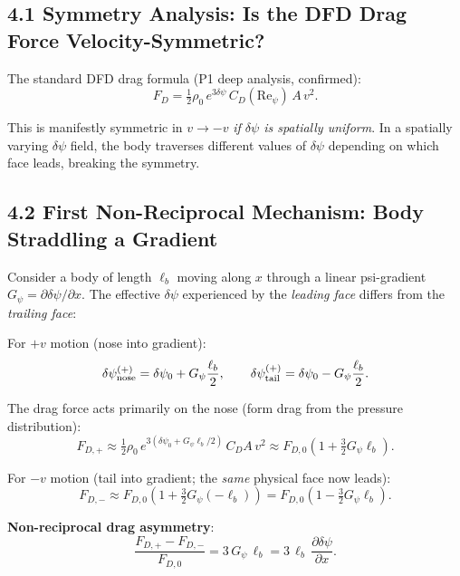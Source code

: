 \documentclass[11pt,twocolumn]{article}
\newcommand{\dpsi}{\delta\psi}
\newcommand{\Rey}{\mathrm{Re}}
\newcommand{\half}{\tfrac{1}{2}}
\begin{document}
\subsection*{4.1 Symmetry Analysis: Is the DFD Drag Force Velocity-Symmetric?}

The standard DFD drag formula (P1 deep analysis, confirmed):
\begin{equation}
F_D = \half\rho_0\,e^{3\dpsi}\,C_D(\Rey_\psi)\,A\,v^2.
\label{eq:drag_standard}
\end{equation}

This is manifestly symmetric in $v \to -v$ \emph{if $\dpsi$ is spatially
uniform}. In a spatially varying $\dpsi$ field, the body traverses
different values of $\dpsi$ depending on which face leads, breaking the
symmetry.

\subsection*{4.2 First Non-Reciprocal Mechanism: Body Straddling a
Gradient}

Consider a body of length $\ell_b$ moving along $x$ through a linear
psi-gradient $G_\psi = \partial\dpsi/\partial x$. The effective
$\dpsi$ experienced by the \emph{leading face} differs from the
\emph{trailing face}:

For $+v$ motion (nose into gradient):
\begin{equation}
\dpsi_{\rm nose}^{(+)} = \dpsi_0 + G_\psi\frac{\ell_b}{2},
\qquad
\dpsi_{\rm tail}^{(+)} = \dpsi_0 - G_\psi\frac{\ell_b}{2}.
\end{equation}

The drag force acts primarily on the nose (form drag from the pressure
distribution):
\begin{equation}
F_{D,+} \approx \half\rho_0\,e^{3(\dpsi_0 + G_\psi\ell_b/2)}\,C_D A\,v^2
\approx F_{D,0}\!\left(1 + \tfrac{3}{2}G_\psi\ell_b\right).
\label{eq:drag_plus}
\end{equation}

For $-v$ motion (tail into gradient; the \emph{same} physical face now leads):
\begin{equation}
F_{D,-} \approx F_{D,0}\!\left(1 + \tfrac{3}{2}G_\psi(-\ell_b)\right)
= F_{D,0}\!\left(1 - \tfrac{3}{2}G_\psi\ell_b\right).
\label{eq:drag_minus}
\end{equation}

\textbf{Non-reciprocal drag asymmetry}:
\begin{equation}
\frac{F_{D,+} - F_{D,-}}{F_{D,0}}
= 3\,G_\psi\,\ell_b
= 3\,\ell_b\,\frac{\partial\dpsi}{\partial x}.
\label{eq:nonrecip_asym}
\end{equation}
\end{document}
